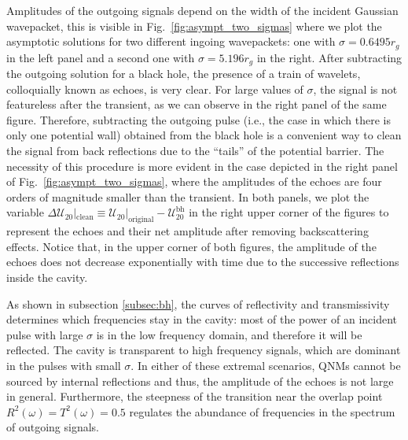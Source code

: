 \documentclass[article,aps,nofootinbib,twocolumn,superscriptaddress]{revtex4-1}
\begin{document}
Amplitudes of the outgoing signals depend on the width of the incident Gaussian wavepacket, this is visible in Fig.~\ref{fig:asympt_two_sigmas} where we plot the asymptotic solutions for two different ingoing wavepackets: one with $\sigma=0.6495r_g$ in the left panel and a second one with $\sigma=5.196r_g$ in the right. After subtracting the outgoing solution for a black hole, the presence of a train of wavelets, colloquially known as echoes, is very clear. For large values of $\sigma$, the signal is not featureless after the transient, as we can observe in the right panel of the same figure. Therefore, subtracting the outgoing pulse (i.e., the case in which there is only one potential wall) obtained from the black hole is a convenient way to clean the signal from back reflections due to the ``tails'' of the potential barrier. The necessity of this procedure is more evident in the case depicted in the right panel of Fig.~\ref{fig:asympt_two_sigmas}, where the amplitudes of the echoes are four orders of magnitude smaller than the transient. In both panels, we plot the variable $\Delta\mathcal{U}_{20}|_{\mathrm{clean}}\equiv\mathcal{U}_{20}|_{\mathrm{original}}-\mathcal{U}^{\mathrm{bh}}_{20}$ in the right upper corner of the figures to represent the echoes and their net amplitude after removing backscattering effects. Notice that, in the upper corner of both figures, the amplitude of the echoes does not decrease exponentially with time due to the successive reflections inside the cavity.
 
As shown in subsection \ref{subsec:bh}, the curves of reflectivity and transmissivity determines which frequencies stay in the cavity: most of the power of an incident pulse with large $\sigma$ is in the low frequency domain, and therefore it will be reflected. The cavity is transparent to high frequency signals, which are dominant in the pulses with small $\sigma$. In either of these extremal scenarios, QNMs cannot be sourced by internal reflections and thus, the amplitude of the echoes is not large in general. Furthermore, the steepness of the transition near the overlap point $R^2(\omega)=T^2(\omega)=0.5$ regulates the abundance of frequencies in the spectrum of outgoing signals.\\
 
\end{document}

